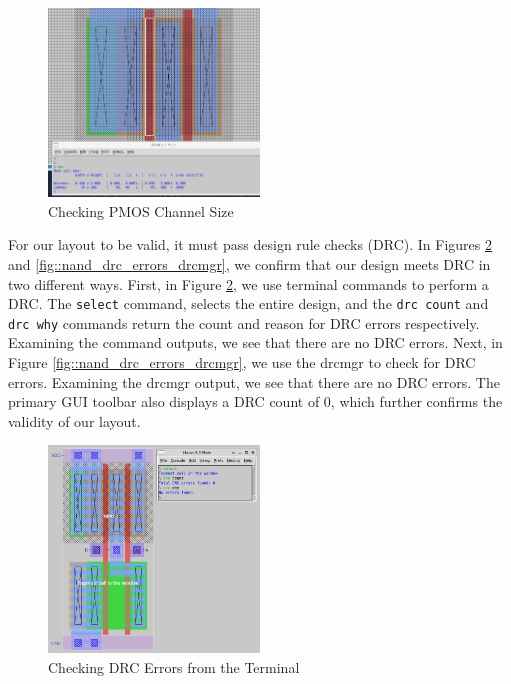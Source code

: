 \documentclass{article}
\begin{document}
	\begin{figure}[H]
		\centerline{\includegraphics[width=0.5\textwidth]{nand_pmos_channel_sizing.png}}
		\caption{Checking PMOS Channel Size}
		\label{fig::nand_pmos_channel_sizing}
	\end{figure}
	
	For our layout to be valid, it must pass design rule checks (DRC). In Figures \ref{fig::nand_drc_errors_terminal} and \ref{fig::nand_drc_errors_drcmgr}, we confirm that our design meets DRC in two different ways. First, in Figure \ref{fig::nand_drc_errors_terminal}, we use terminal commands to perform a DRC. The \texttt{select} command, selects the entire design, and the \texttt{drc count} and \texttt{drc why} commands return the count and reason for DRC errors respectively. Examining the command outputs, we see that there are no DRC errors. Next, in Figure \ref{fig::nand_drc_errors_drcmgr}, we use the drcmgr to check for DRC errors. Examining the drcmgr output, we see that there are no DRC errors. The primary GUI toolbar also displays a DRC count of 0, which further confirms the validity of our layout.
	
	\begin{figure}[H]
		\centerline{\includegraphics[width=0.5\textwidth]{nand_drc_errors_terminal.png}}
		\caption{Checking DRC Errors from the Terminal}
		\label{fig::nand_drc_errors_terminal}
	\end{figure}
	
\end{document}
